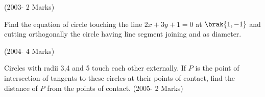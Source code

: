 \hfill(2003- 2 Marks)\\ 





\item Find the equation of circle touching the line $2x+3y+1=0$ at $\brak{1,-1}$ and cutting orthogonally the circle having line segment joining  and  as diameter.


\hfill(2004- 4 Marks)\\     




\item Circles with radii 3,4 and 5 touch each other externally. If $P$ is the point of intersection of tangents to these circles at their points of contact, find the distance of $P$ from the points of contact.
	           \hfill(2005- 2 Marks)\\ 

